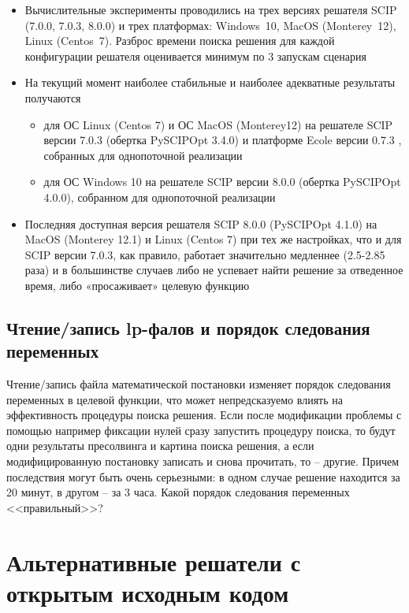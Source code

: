 \documentclass[%
	11pt,
	a4paper,
	utf8,
		]{article}
\begin{document}
\begin{itemize}
	\item Вычислительные эксперименты проводились на трех версиях решателя SCIP (7.0.0, 7.0.3, 8.0.0) и трех платформах: Windows~10, MacOS (Monterey~12), Linux (Centos~7). Разброс времени поиска решения для каждой конфигурации решателя оценивается минимум по 3 запускам сценария
	
	\item На текущий момент наиболее стабильные и наиболее адекватные результаты получаются
	\begin{itemize}
		\item для ОС Linux (Centos 7) и ОС MacOS (Monterey12) на решателе SCIP версии 7.0.3 (обертка PySCIPOpt 3.4.0) и платформе Ecole версии 0.7.3 , собранных для однопоточной реализации
		
		\item для ОС Windows 10 на решателе SCIP версии 8.0.0 (обертка PySCIPOpt 4.0.0), собранном для однопоточной реализации
	\end{itemize}
	
	\item Последняя доступная версия решателя SCIP 8.0.0 (PySCIPOpt 4.1.0) на MacOS (Monterey 12.1) и Linux (Centos 7) при тех же настройках, что и для SCIP версии 7.0.3, как правило, работает значительно медленнее (2.5-2.85 раза) и в большинстве случаев либо не успевает найти решение за отведенное время, либо «просаживает» целевую функцию
\end{itemize}

\subsection{Чтение/запись lp-фалов и порядок следования переменных}

Чтение/запись файла математической постановки изменяет порядок следования переменных в целевой функции, что может непредсказуемо влиять на эффективность процедуры поиска решения. Если после модификации проблемы с помощью например фиксации нулей сразу запустить процедуру поиска, то будут одни результаты пресолвинга и картина поиска решения, а если модифицированную постановку записать и снова прочитать, то -- другие. Причем последствия могут быть очень серьезными: в одном случае решение находится за 20 минут, в другом -- за 3 часа. Какой порядок следования переменных <<правильный>>?

\section{Альтернативные решатели с открытым исходным кодом}
\end{document}
